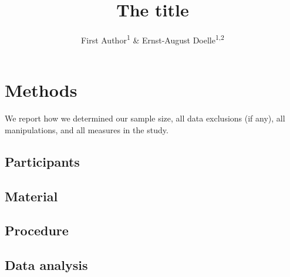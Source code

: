 \documentclass[
  english,
  man]{apa6}
\title{The title}
\author{First Author\textsuperscript{1} \& Ernst-August Doelle\textsuperscript{1,2}}
\date{}
\affiliation{\vspace{0.5cm}\textsuperscript{1} Wilhelm-Wundt-University\\\textsuperscript{2} Konstanz Business School}
\begin{document}
\maketitle

\hypertarget{methods}{%
\section{Methods}\label{methods}}

We report how we determined our sample size, all data exclusions (if any), all manipulations, and all measures in the study.

\hypertarget{participants}{%
\subsection{Participants}\label{participants}}

\hypertarget{material}{%
\subsection{Material}\label{material}}

\hypertarget{procedure}{%
\subsection{Procedure}\label{procedure}}

\hypertarget{data-analysis}{%
\subsection{Data analysis}\label{data-analysis}}
\end{document}
